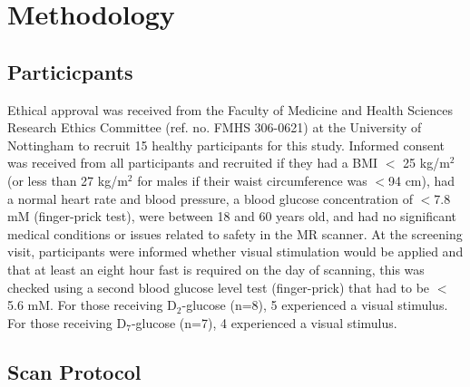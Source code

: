 \documentclass[class=article, crop=false]{standalone}
\begin{document}
\section{Methodology}

\subsection{Particicpants}


Ethical approval was received from the Faculty of Medicine and Health Sciences Research Ethics Committee (ref. no. FMHS 306-0621) at the University of Nottingham to recruit 15 healthy participants for this study. Informed consent was received from all participants and recruited if they had a BMI $<$ 25 kg/m$^2$ (or less than 27 kg/m$^2$ for males if their waist circumference was $<$94 cm), had a normal heart rate and blood pressure, a blood glucose concentration of $<$7.8 mM (finger-prick test), were between 18 and 60 years old, and had no significant medical conditions or issues related to safety in the MR scanner. At the screening visit, participants were informed whether visual stimulation would be applied and that at least an eight hour fast is required on the day of scanning, this was checked using a second blood glucose level test (finger-prick) that had to be $<$5.6 mM. For those receiving D$_2$-glucose (n=8), 5 experienced a visual stimulus. For those receiving D$_7$-glucose (n=7), 4 experienced a visual stimulus.

\subsection{Scan Protocol}
\end{document}
